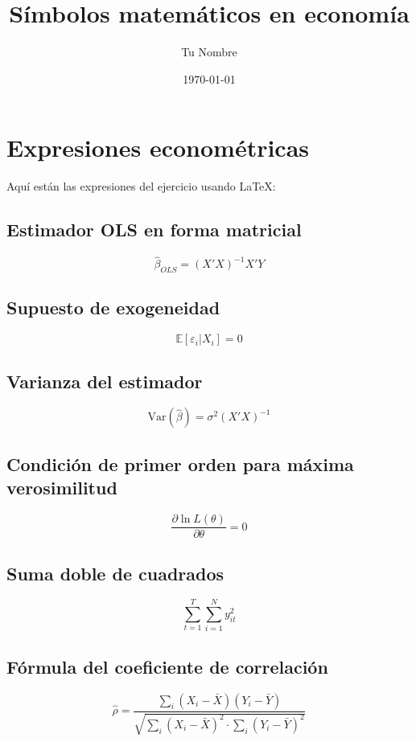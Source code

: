 \documentclass[12pt, a4paper]{article}
\title{Símbolos matemáticos en economía}
\author{Tu Nombre}
\date{\today}
\begin{document}
\maketitle

\section{Expresiones econométricas}

Aquí están las expresiones del ejercicio usando LaTeX:

\subsection{Estimador OLS en forma matricial}
\[
  \hat{\beta}_{OLS} = (X'X)^{-1}X'Y
\]

\subsection{Supuesto de exogeneidad}
\[
  \mathbb{E}[\varepsilon_i | X_i] = 0
\]

\subsection{Varianza del estimador}
\[
  \text{Var}(\hat{\beta}) = \sigma^2(X'X)^{-1}
\]

\subsection{Condición de primer orden para máxima verosimilitud}
\[
  \frac{\partial \ln L(\theta)}{\partial \theta} = 0
\]

\subsection{Suma doble de cuadrados}
\[
  \sum_{t=1}^{T} \sum_{i=1}^{N} y_{it}^2
\]

\subsection{Fórmula del coeficiente de correlación}
\[
  \hat{\rho} = \frac{\sum_i (X_i - \bar{X})(Y_i - \bar{Y})}
                     {\sqrt{\sum_i(X_i-\bar{X})^2 \cdot \sum_i(Y_i-\bar{Y})^2}}
\]
\end{document}
